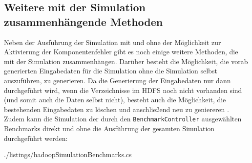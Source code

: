 \subsection{Weitere mit der Simulation zusammenhängende Methoden}
\label{sec:simulationUtilities}

Neben der Ausführung der Simulation mit und ohne der Möglichkeit zur Aktivierung der Komponentenfehler gibt es noch einige weitere Methoden, die mit der Simulation zusammenhängen.
Darüber besteht die Möglichkeit, die vorab generierten Eingabedaten für die Simulation ohne die Simulation selbst auszuführen, zu generieren.
Da die Generierung der Eingabedaten nur dann durchgeführt wird, wenn die Verzeichnisse im \ac{HDFS} noch nicht vorhanden sind (und somit auch die Daten selbst nicht), besteht auch die Möglichkeit, die bestehenden Eingabedaten zu löschen und anschließend neu zu geniereren .
Zudem kann die Simulation der durch den \texttt{BenchmarkController} ausgewählten Benchmarks direkt und ohne die Ausführung der gesamten Simulation durchgeführt werden:


{./listings/hadoopSimulationBenchmarks.cs}
